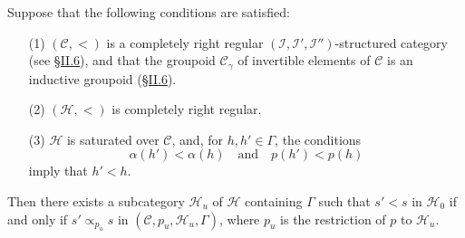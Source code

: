 \documentclass[a4paper,fleqn]{article}
\theoremstyle{plain}
\newenvironment{theorem}[1]
  {\renewcommand\theinnertheorem{#1}\innertheorem}
  {\endinnertheorem}
\theoremstyle{definition}
\newcommand{\oldpage}[1]{{\marginpar{\footnotesize$\bigg\vert$\,\,\,\,\textit{p.~#1}}}}
\newcommand{\textand}{\quad\text{and}\quad}
\newcommand{\CC}{\mathcal{C}}
\newcommand{\HH}{\mathcal{H}}
\newcommand{\subs}{\mathrel{\propto}}
\newcommand{\II}{\mathcal{I}}
\begin{document}
\begin{theorem}{4}
\label{theorem:i-4}
  Suppose that the following conditions are satisfied:
  \begin{enumerate}
    \item[\normalfont(1)]
      $(\CC,<)$ is a completely right regular $(\II,\II',\II'')$-structured category (see \hyperref[section:ii.6]{§II.6}), and that the groupoid $\CC_\gamma$ of invertible elements of $\CC$ is an inductive groupoid (\hyperref[section:ii.6]{§II.6}).

    \item[\normalfont(2)]
      $(\HH,<)$ is completely right regular.

    \item[\normalfont(3)]
      $\HH$ is saturated over $\CC$, and, for $h,h'\in\Gamma$, the conditions
      \[
        \alpha(h')<\alpha(h)
        \textand
        p(h')<p(h)
      \]
      imply that $h'<h$.
  \end{enumerate}

  \oldpage{377}
  Then there exists a subcategory $\HH_u$ of $\HH$ containing $\Gamma$ such that $s'<s$ in $\HH_0$ if and only if $s'\subs_{p_u}s$ in $(\CC,p_u,\HH_u,\Gamma)$, where $p_u$ is the restriction of $p$ to $\HH_u$.
\end{theorem}
\end{document}
